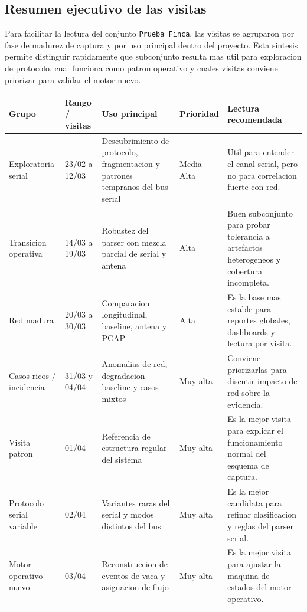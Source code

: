 %
% 

\subsection{Resumen ejecutivo de las visitas}

Para facilitar la lectura del conjunto \texttt{Prueba\_Finca}, las visitas se
agruparon por fase de madurez de captura y por uso principal dentro del
proyecto. Esta sintesis permite distinguir rapidamente que subconjunto resulta
mas util para exploracion de protocolo, cual funciona como patron operativo y
cuales visitas conviene priorizar para validar el motor nuevo.

\begin{table}[h]
\centering
\small
\renewcommand{\arraystretch}{1.15}
\begin{tabularx}{\textwidth}{|p{2.8cm}|p{3.2cm}|p{4.0cm}|p{2.4cm}|X|}
\hline
\textbf{Grupo} & \textbf{Rango / visitas} & \textbf{Uso principal} & \textbf{Prioridad} & \textbf{Lectura recomendada} \\
\hline
Exploratoria serial & 23/02 a 12/03 & Descubrimiento de protocolo, fragmentacion y patrones tempranos del bus serial & Media-Alta & Util para entender el canal serial, pero no para correlacion fuerte con red. \\
\hline
Transicion operativa & 14/03 a 19/03 & Robustez del parser con mezcla parcial de serial y antena & Alta & Buen subconjunto para probar tolerancia a artefactos heterogeneos y cobertura incompleta. \\
\hline
Red madura & 20/03 a 30/03 & Comparacion longitudinal, baseline, antena y PCAP & Alta & Es la base mas estable para reportes globales, dashboards y lectura por visita. \\
\hline
Casos ricos / incidencia & 31/03 y 04/04 & Anomalias de red, degradacion baseline y casos mixtos & Muy alta & Conviene priorizarlas para discutir impacto de red sobre la evidencia. \\
\hline
Visita patron & 01/04 & Referencia de estructura regular del sistema & Muy alta & Es la mejor visita para explicar el funcionamiento normal del esquema de captura. \\
\hline
Protocolo serial variable & 02/04 & Variantes raras del serial y modos distintos del bus & Muy alta & Es la mejor candidata para refinar clasificacion y reglas del parser serial. \\
\hline
Motor operativo nuevo & 03/04 & Reconstruccion de eventos de vaca y asignacion de flujo & Muy alta & Es la mejor visita para ajustar la maquina de estados del motor operativo. \\
\hline
\end{tabularx}
\end{table}


